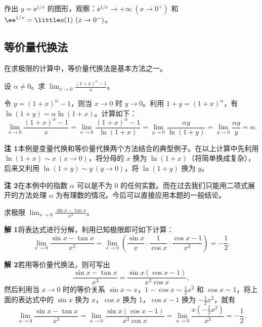 \begin{xthought}[4]
作出 $y=\ee^{1/x}$ 的图形，观察：$\ee^{1/x}\to+\infty\ (x\to0^+)$ 和 $\ee^{1/x}=\littleo(1)\ (x\to0^-)$。
\end{xthought}

\subsection{等价量代换法}

在求极限的计算中，等价量代换法是基本方法之一。

\begin{xexample}[4.4.4]
设 $\alpha\ne0$。求 $\displaystyle\lim_{x\to0}\frac{(1+x)^\alpha-1}{x}$。
\end{xexample}
\begin{xsolution}
令 $y=(1+x)^\alpha-1$，则当 $x\to0$ 时 $y\to0$。利用 $1+y=(1+x)^\alpha$，有 $\ln(1+y)=\alpha\ln(1+x)$。计算如下：
\[
  \lim_{x\to0}\frac{(1+x)^\alpha-1}{x}
  =\lim_{x\to0}\frac{(1+x)^\alpha-1}{\ln(1+x)}
  =\lim_{y\to0}\frac{\alpha y}{\ln(1+y)}
  =\lim_{y\to0}\frac{\alpha y}{y}=\alpha.
\]
\end{xsolution}

\begin{xremark}
\textbf{注 1}\quad 本例是变量代换和等价量代换两个方法结合的典型例子。在以上计算中先利用 $\ln(1+x)\sim x\ (x\to0)$，将分母的 $x$ 换为 $\ln(1+x)$（将简单换成复杂），后来又利用 $\ln(1+y)\sim y\ (y\to0)$，将 $\ln(1+y)$ 换为 $y$。

\textbf{注 2}\quad 在本例中的指数 $\alpha$ 可以是不为 0 的任何实数。而在过去我们只能用二项式展开的方法处理 $\alpha$ 为有理数的情况。今后可以直接应用本题的一般结论。
\end{xremark}

\begin{xexample}[4.4.5]
求极限 $\displaystyle\lim_{x\to0}\frac{\sin x-\tan x}{x^3}$。
\end{xexample}
\begin{xsolution}
\textbf{解 1}\quad 将表达式进行分解，利用已知极限即可如下计算：
\[
  \lim_{x\to0}\frac{\sin x-\tan x}{x^3}
  =\lim_{x\to0}\left(\frac{\sin x}{x}\cdot\frac1{\cos x}\cdot\frac{\cos x-1}{x^2}\right)
  =-\frac12.
\]

\textbf{解 2}\quad 若用等价量代换法，则可写出
\[
  \frac{\sin x-\tan x}{x^3}=\frac{\sin x(\cos x-1)}{x^3\cos x},
\]
然后利用当 $x\to0$ 时的等价关系 $\sin x\sim x$，$1-\cos x\sim\frac12x^2$ 和 $\cos x\sim1$，将上面的表达式中的 $\sin x$ 换为 $x$，$\cos x$ 换为 1，$\cos x-1$ 换为 $-\frac12x^2$，就有
\[
  \lim_{x\to0}\frac{\sin x-\tan x}{x^3}
  =\lim_{x\to0}\frac{\sin x(\cos x-1)}{x^3\cos x}
  =\lim_{x\to0}\frac{x(-\frac12x^2)}{x^3}=-\frac12.
\]
\end{xsolution}

